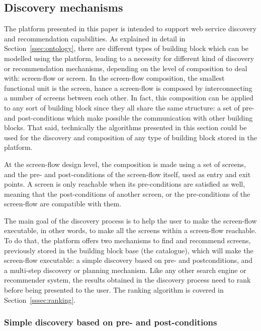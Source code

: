 
\subsection{Discovery mechanisms} %
\label{ssec:discovery}

The platform presented in this paper is intended to support web service discovery and recommendation capabilities.
As explained in detail in Section~\ref{ssec:ontology}, there are different types of building block which can be modelled
using the platform, leading to a necessity for different kind of discovery or recommendation mechanisms, depending
on the level of composition to deal with: screen-flow or screen. In the screen-flow composition, the smallest
functional unit is the screen, hance a screen-flow is composed by interconnecting a number of screens between 
each other. In fact, this composition can be applied to any sort of building block since they all share the
same structure: a set of pre- and post-conditions which make possible the communication with other building blocks.
That said, technically the algorithms presented in this section could be used for the discovery and composition of
any type of building block stored in the platform.

At the screen-flow design level, the composition is made using a set of screens, and the pre- and post-conditions 
of the screen-flow itself, used as entry and exit points. A screen is only reachable when its pre-conditions are satisfied
as well, meaning that the post-conditions of another screen, or the pre-conditions of the screen-flow are compatible 
with them.

The main goal of the discovery process is to help the user to make the screen-flow executable, in other words, to make
all the screens within a screen-flow reachable. To do that, the platform offers two mechanisms to find and recommend
screens, previously stored in the building block base (the catalogue), which will make the screen-flow executable: a
simple discovery based on pre- and postconditions, and a multi-step discovery or planning mechanism. Like any other
search engine or recommender system, the results obtained in the discovery process need to rank before being presented
to the user. The ranking algorithm is covered in Section~\ref{sssec:ranking}. 

\subsubsection{Simple discovery based on pre- and post-conditions}
\label{sssec:simple_discovery}

